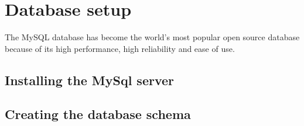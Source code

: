 
\section{Database setup}
The MySQL database has become the world's most popular open source database because of its high performance, high reliability and ease of use.
\subsection{Installing the MySql server}
\subsection{Creating the database schema}
